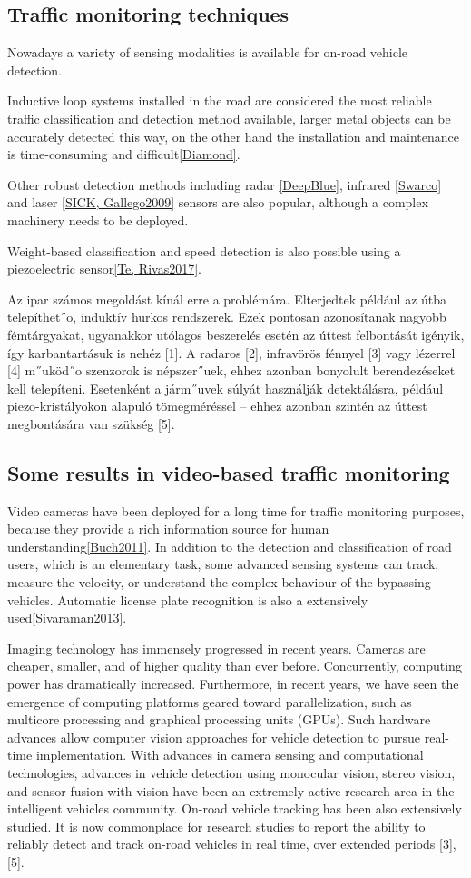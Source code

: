 \subsection{Traffic monitoring techniques}
Nowadays a variety of sensing modalities is available for on-road vehicle detection.

Inductive loop systems installed in the road are considered the most reliable traffic classification and detection method available, larger metal objects can be accurately detected this way, on the other hand the installation and maintenance is time-consuming and difficult\ref{Diamond}.

Other robust detection methods including radar \ref{DeepBlue}, infrared \ref{Swarco} and laser \ref{SICK, Gallego2009} sensors are also popular, although a complex machinery needs to be deployed.

Weight-based classification and speed detection is also possible using a piezoelectric sensor\ref{Te, Rivas2017}.

Az ipar számos megoldást kínál erre a problémára. Elterjedtek például az útba telepíthet˝o,
induktív hurkos rendszerek. Ezek pontosan azonosítanak nagyobb fémtárgyakat, ugyanakkor utólagos
beszerelés esetén az úttest felbontását igényik, így karbantartásuk is nehéz [1]. A radaros [2],
infravörös fénnyel [3] vagy lézerrel [4] m˝uköd˝o szenzorok is népszer˝uek, ehhez azonban bonyolult
berendezéseket kell telepíteni. Esetenként a járm˝uvek súlyát használják detektálásra, például
piezo-kristályokon alapuló tömegméréssel – ehhez azonban szintén az úttest megbontására van
szükség [5].

\subsection{Some results in video-based traffic monitoring}
Video cameras have been deployed for a long time for traffic monitoring purposes, because they provide a rich information source for human understanding\ref{Buch2011}.
In addition to the detection and classification of road users, which is an elementary task, some advanced sensing systems can track, measure the velocity, or understand the complex behaviour of the bypassing vehicles.
Automatic license plate recognition is also a extensively used\ref{Sivaraman2013}. 

 Imaging technology has immensely progressed
in recent years. Cameras are cheaper, smaller, and of higher
quality than ever before. Concurrently, computing power has
dramatically increased. Furthermore, in recent years, we have
seen the emergence of computing platforms geared toward
parallelization, such as multicore processing and graphical processing
units (GPUs). Such hardware advances allow computer
vision approaches for vehicle detection to pursue real-time
implementation.
With advances in camera sensing and computational technologies,
advances in vehicle detection using monocular vision,
stereo vision, and sensor fusion with vision have been
an extremely active research area in the intelligent vehicles
community. On-road vehicle tracking has been also extensively
studied. It is now commonplace for research studies to report
the ability to reliably detect and track on-road vehicles in real
time, over extended periods [3], [5].


